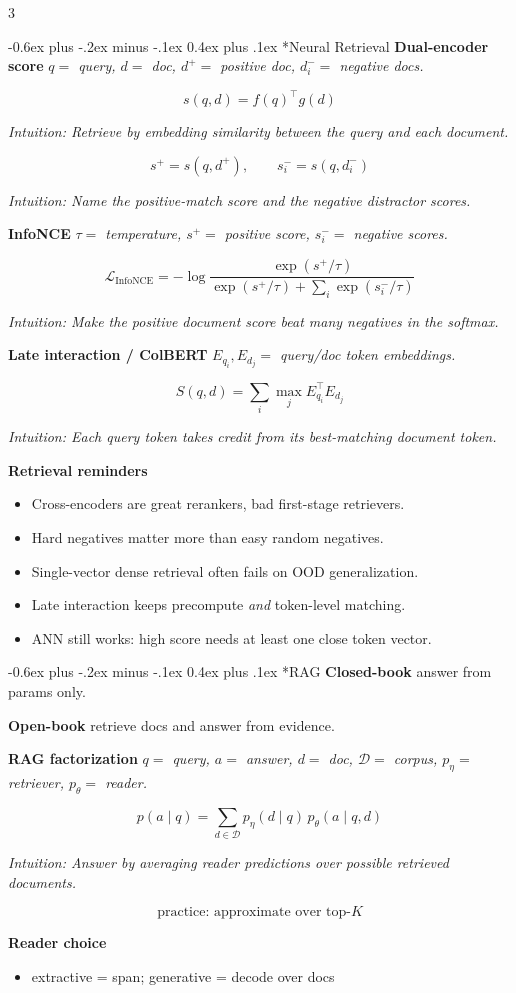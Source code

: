 \documentclass[10pt,landscape]{article}
\makeatletter
\renewcommand{\section}{\@startsection{section}{1}{0mm}%
  {-0.6ex plus -.2ex minus -.1ex}%
  {0.4ex plus .1ex}%
  {\normalfont\normalsize\bfseries}}
\newcommand{\InfoNCE}{\operatorname{InfoNCE}}
\newcommand{\head}[1]{\section*{#1}}
\newcommand{\mini}[1]{\textbf{#1}}
\newcommand{\defs}[1]{{\emph{#1}}\par}
\newcommand{\intuition}[1]{{\scriptsize\emph{Intuition: #1}\par}}
\makeatother
\begin{document}
\begin{multicols}{3}

\head{Neural Retrieval}
\mini{Dual-encoder score}
\defs{\(q=\) query,\; \(d=\) doc,\; \(d^+=\) positive doc,\; \(d_i^-=\) negative docs.}
\[
s(q,d)=f(q)^\top g(d)
\]
\intuition{Retrieve by embedding similarity between the query and each document.}
\[
s^+=s(q,d^+),
\qquad
s_i^-=s(q,d_i^-)
\]
\intuition{Name the positive-match score and the negative distractor scores.}

\mini{InfoNCE}
\defs{\(\tau=\) temperature,\; \(s^+=\) positive score,\; \(s_i^-=\) negative scores.}
\[
\mathcal L_{\InfoNCE}
=
-\log
\frac{
\exp(s^+/\tau)
}{
\exp(s^+/\tau)
+
\sum_i \exp(s_i^-/\tau)
}
\]
\intuition{Make the positive document score beat many negatives in the softmax.}

\mini{Late interaction / ColBERT}
\defs{\(E_{q_i},E_{d_j}=\) query/doc token embeddings.}
\[
S(q,d)=\sum_i \max_j E_{q_i}^\top E_{d_j}
\]
\intuition{Each query token takes credit from its best-matching document token.}

\mini{Retrieval reminders}
\begin{itemize}
\item Cross-encoders are great rerankers, bad first-stage retrievers.
\item Hard negatives matter more than easy random negatives.
\item Single-vector dense retrieval often fails on OOD generalization.
\item Late interaction keeps precompute \emph{and} token-level matching.
\item ANN still works: high score needs at least one close token vector.
\end{itemize}

\head{RAG}
\mini{Closed-book} answer from params only.\par
\mini{Open-book} retrieve docs and answer from evidence.

\mini{RAG factorization}
\defs{\(q=\) query,\; \(a=\) answer,\; \(d=\) doc,\; \(\mathcal D=\) corpus,\; \(p_\eta=\) retriever,\; \(p_\theta=\) reader.}
\[
p(a\mid q)=\sum_{d\in\mathcal D} p_\eta(d\mid q)\, p_\theta(a\mid q,d)
\]
\intuition{Answer by averaging reader predictions over possible retrieved documents.}
\[
\text{practice: approximate over top-}K
\]

\mini{Reader choice}
\begin{itemize}
\item extractive = span; generative = decode over docs
\end{itemize}


\end{multicols}
\end{document}
